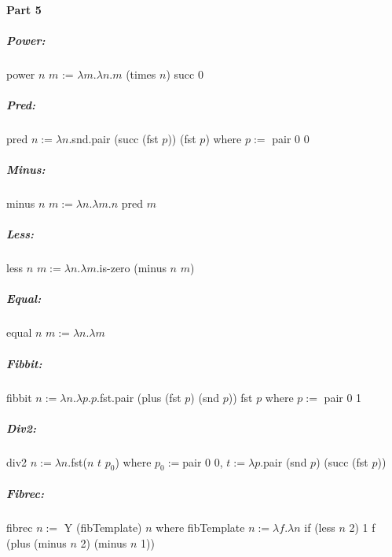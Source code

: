\documentclass[12pt]{article}
\begin{document}
\paragraph{Part 5}
\subparagraph{Power:}
\raggedright

power $n$ $m$ := $\lambda m. \lambda n.m$ (times $n$) succ 0
\subparagraph{Pred:}
pred $n:= \lambda n$.snd.pair (succ (fst $p$)) (fst $p$) where $p := $ pair 0 0
\subparagraph{Minus:} 
minus $n$ $m := \lambda n. \lambda m.n$ pred $m$
\subparagraph{Less:}
less $n$ $m := \lambda n. \lambda m.$is-zero (minus $n$ $m$)
\subparagraph{Equal:}
equal $n$ $m := \lambda n. \lambda m$
\subparagraph{Fibbit:}
fibbit $n := \lambda n. \lambda p. p.$fst.pair (plus (fst $p$) (snd $p$)) fst $p$ where $p := $ pair 0 1
\subparagraph{Div2:}
div2 $n := \lambda n.$fst($n$ $t$ $p_{0}$) where $p_{0} := $pair 0 0, $t := \lambda p.$pair (snd $p$) (succ (fst $p$))
\subparagraph{Fibrec:}
fibrec $n :=$ Y (fibTemplate) $n$ where fibTemplate $n := \lambda f.\lambda n$ if (less $n$ 2) 1 f (plus (minus $n$ 2) (minus $n$ 1))
\enddocument
\end{document}
